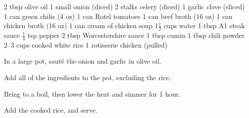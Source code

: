 \dishtype{}
\begin{ingreds}
    2 tbsp olive oil
    1 small onion (diced)
    2 stalks celery (diced)
    1 garlic clove (sliced)
    1 can green chilis (4 oz)
    1 can Rotel tomatoes
    1 can beef broth (16 oz)
    1 can chicken broth (16 oz)
    1 can cream of chicken soup
    1$\frac{1}{2}$ cups water
    1 tbsp A1 steak sauce
    $\frac{1}{4}$ tsp pepper
    2 tbsp Worcestershire sauce
    1 tbsp cumin
    1 tbsp chili powder
    2--3 cups cooked white rice 
    1 rotisserie chicken (pulled) 
\end{ingreds}
\begin{method}
    In a large pot, saut\'e the onion and garlic in olive oil.\par
    Add all of the ingredients to the pot, excluding the rice.\par
    Bring to a boil, then lower the heat and simmer for 1 hour.\par
    Add the cooked rice, and serve.
\end{method}